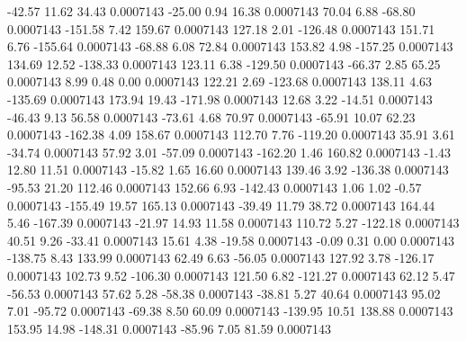       -42.57       11.62       34.43     0.0007143
      -25.00        0.94       16.38     0.0007143
       70.04        6.88      -68.80     0.0007143
     -151.58        7.42      159.67     0.0007143
      127.18        2.01     -126.48     0.0007143
      151.71        6.76     -155.64     0.0007143
      -68.88        6.08       72.84     0.0007143
      153.82        4.98     -157.25     0.0007143
      134.69       12.52     -138.33     0.0007143
      123.11        6.38     -129.50     0.0007143
      -66.37        2.85       65.25     0.0007143
        8.99        0.48        0.00     0.0007143
      122.21        2.69     -123.68     0.0007143
      138.11        4.63     -135.69     0.0007143
      173.94       19.43     -171.98     0.0007143
       12.68        3.22      -14.51     0.0007143
      -46.43        9.13       56.58     0.0007143
      -73.61        4.68       70.97     0.0007143
      -65.91       10.07       62.23     0.0007143
     -162.38        4.09      158.67     0.0007143
      112.70        7.76     -119.20     0.0007143
       35.91        3.61      -34.74     0.0007143
       57.92        3.01      -57.09     0.0007143
     -162.20        1.46      160.82     0.0007143
       -1.43       12.80       11.51     0.0007143
      -15.82        1.65       16.60     0.0007143
      139.46        3.92     -136.38     0.0007143
      -95.53       21.20      112.46     0.0007143
      152.66        6.93     -142.43     0.0007143
        1.06        1.02       -0.57     0.0007143
     -155.49       19.57      165.13     0.0007143
      -39.49       11.79       38.72     0.0007143
      164.44        5.46     -167.39     0.0007143
      -21.97       14.93       11.58     0.0007143
      110.72        5.27     -122.18     0.0007143
       40.51        9.26      -33.41     0.0007143
       15.61        4.38      -19.58     0.0007143
       -0.09        0.31        0.00     0.0007143
     -138.75        8.43      133.99     0.0007143
       62.49        6.63      -56.05     0.0007143
      127.92        3.78     -126.17     0.0007143
      102.73        9.52     -106.30     0.0007143
      121.50        6.82     -121.27     0.0007143
       62.12        5.47      -56.53     0.0007143
       57.62        5.28      -58.38     0.0007143
      -38.81        5.27       40.64     0.0007143
       95.02        7.01      -95.72     0.0007143
      -69.38        8.50       60.09     0.0007143
     -139.95       10.51      138.88     0.0007143
      153.95       14.98     -148.31     0.0007143
      -85.96        7.05       81.59     0.0007143
